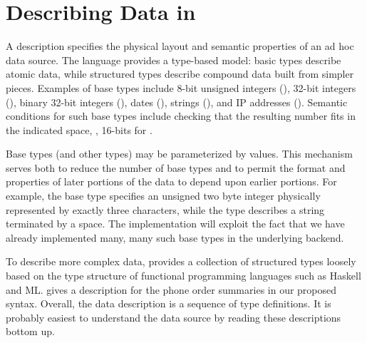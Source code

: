 \section{Describing Data in \datatype{}}
\label{sec:data-description}

A \datatype{} description specifies the physical layout and semantic
properties of an ad hoc data source.  The language provides a
type-based model: basic types describe atomic data, while structured
types describe compound data built from simpler pieces.  Examples of
base types include 8-bit unsigned integers (), 32-bit
integers (), binary 32-bit integers (), dates
(), strings (), and IP addresses ().
Semantic conditions for such base types include checking that the
resulting number fits in the indicated space, \ie, 16-bits for
.

Base types (and other types) may be parameterized by values.  This
mechanism serves both to reduce the number of base types and to permit
the format and properties of later portions of the data to depend upon
earlier portions.  For example, the base type 
specifies an unsigned two byte integer physically represented by
exactly three characters, while the type  describes a
string terminated by a space.  The \datatype{} implementation will
exploit the fact that we have already implemented many, many such base
types in the underlying \pads{} backend.

To describe more complex data, \datatype{} provides a collection of
structured types loosely based on the type structure of functional
programming languages such as Haskell and ML.
 gives a \datatype{} description for the
\dibbler{} phone order summaries in our proposed syntax.  Overall, the
data description is a sequence of type definitions.  It is probably
easiest to understand the data source by reading these descriptions
bottom up.


